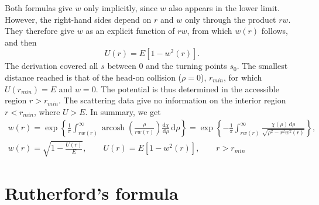 \begin{problem}[title={Repulsive field from cross-section (Firsov)}]
{Both formulas give $w$ only implicitly, since $w$ also appears in the lower limit. However, the right-hand sides depend on $r$ and $w$ only through the product $rw$. They therefore give $w$ as an explicit function of $rw$, from which $w(r)$ follows, and then
\begin{equation*}
    U(r) = E\left[ 1 - w^2(r) \right].
\end{equation*}
The derivation covered all $s$ between $0$ and the turning points $s_0$. The smallest distance reached is that of the head-on collision ($\rho = 0$), $r_{min}$, for which $U(r_{min}) = E$ and $w = 0$. The potential is thus determined in the accessible region $r > r_{min}$. The scattering data give no information on the interior region $r < r_{min}$, where $U > E$. In summary, we get
}
{
\begin{gather*}
    w(r) = \exp{\left\{ \frac{1}{\pi}\int_{rw(r)}^\infty \operatorname{arcosh}\left( \frac{\rho}{rw(r)} \right)\frac{\mathrm{d}\chi}{\mathrm{d}\rho}\,\mathrm{d}\rho \right\}} = \exp{\left\{ -\frac{1}{\pi}\int_{rw(r)}^\infty \frac{\chi(\rho)\,\mathrm{d}\rho}{\sqrt{\rho^2 - r^2w^2(r)}} \right\}}, \\
    w(r) = \sqrt{1 - \frac{U(r)}{E}}, \qquad U(r) = E\left[ 1 - w^2(r) \right], \qquad r > r_{min}
\end{gather*}
}
\end{problem}

\section{Rutherford's formula}


